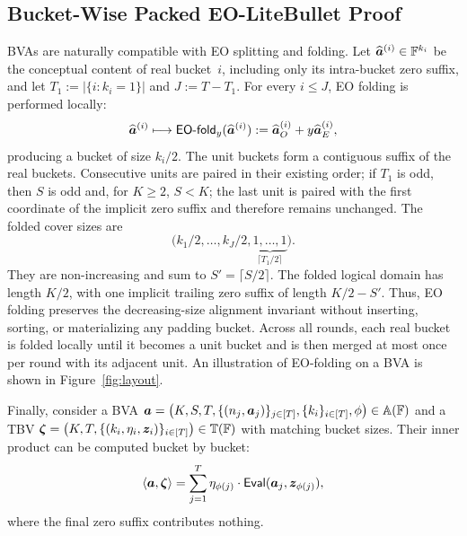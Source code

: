 

\subsection{Bucket-Wise Packed EO-LiteBullet Proof}
\label{sec:bucketpackedeolitebullet}

BVAs are naturally compatible with EO splitting and folding.  Let
$\widehat{\bm a}^{(i)}\in{\mathbb{F}}^{k_i}$ be the conceptual content of real
bucket~$i$, including only its intra-bucket zero suffix, and let
$T_1:=|\{i:k_i=1\}|$ and $J:=T-T_1$.  For every $i\le J$, EO folding is
performed locally:
\[
  \widehat{\bm a}^{(i)}
  \longmapsto
  {\mathsf{EO}\textrm{-}\mathsf{fold}}_y(\widehat{\bm a}^{(i)})
  :=\widehat{\bm a}^{(i)}_O+y\widehat{\bm a}^{(i)}_E,
\]
producing a bucket of size $k_i/2$.  The unit buckets form a contiguous suffix
of the real buckets.  Consecutive units are paired in their existing order; if
$T_1$ is odd, then $S$ is odd and, for $K\ge2$, $S<K$; the last unit is paired with the
first coordinate of the implicit zero suffix and therefore remains unchanged.
The folded cover sizes are
\[
  \bigl(k_1/2,\ldots,k_J/2,
  \underbrace{1,\ldots,1}_{\lceil T_1/2\rceil}\bigr).
\]
They are non-increasing and sum to
$S'=\lceil S/2\rceil$.  The folded logical domain has length $K/2$, with one
implicit trailing zero suffix of length $K/2-S'$.  Thus, EO folding preserves
the decreasing-size alignment invariant without inserting, sorting, or
materializing any padding bucket.  Across all rounds, each real bucket is folded
locally until it becomes a unit bucket and is then merged at most once per
round with its adjacent unit.
An illustration of EO-folding on a BVA is shown in
Figure~\ref{fig:layout}.

Finally, consider a BVA
\(
\bm{a}=\left(
    K, S, T, \{(n_j, \bm{a}_j)\}_{j\in [T]}, \{k_i\}_{i\in [T]}, \phi
\right) \in {\mathbb{A}({\mathbb{F}})}
\)
and a TBV
\(
\bm{\zeta}
=
\big(K,T,\{(k_i,\eta_i,\bm{z}_i)\}_{i\in[T]}\big)
\in{\mathbb{T}}({\mathbb{F}})
\)
with matching bucket sizes.
Their inner product can be computed bucket by bucket:
\begin{equation}
\label{eq:ipbvatbv}
    \langle \bm{a}, \bm{\zeta} \rangle
    =
\sum_{j=1}^T
    \eta_{\phi(j)} \cdot \mathsf{Eval}(\bm{a}_j, \bm{z}_{\phi(j)}),
\end{equation}
where the final zero suffix contributes nothing.


